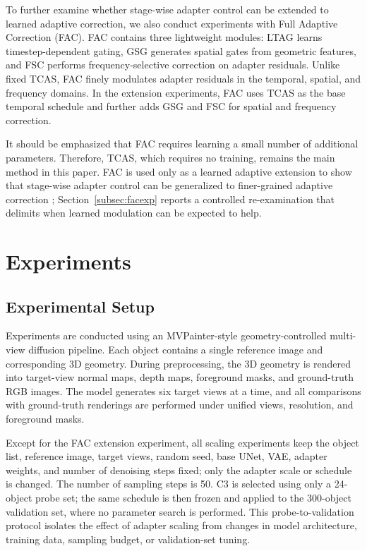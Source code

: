 \documentclass[times,twocolumn,final]{elsarticle}
\providecommand{\DIFadd}[1]{{\protect\color{red} \sf #1}} %
\providecommand{\DIFdel}[1]{{\protect\color{red} \scriptsize #1}} %
\providecommand{\DIFaddbegin}{} %
\providecommand{\DIFaddend}{} %
\providecommand{\DIFdelbegin}{} %
\providecommand{\DIFdelend}{} %
\newcommand{\DIFscaledelfig}{0.5}
\newlength{\DIFdelgraphicswidth} %
\newlength{\DIFdelgraphicsheight} %
\newcommand{\DIFaddincludegraphics}[2][]{{\color{red}\fbox{\DIFOincludegraphics[#1]{#2}}}} %
\newcommand{\DIFdelincludegraphics}[2][]{%
\sbox{\DIFdelgraphicsbox}{\DIFOincludegraphics[#1]{#2}}%
\settoboxwidth{\DIFdelgraphicswidth}{\DIFdelgraphicsbox} %
\settoboxtotalheight{\DIFdelgraphicsheight}{\DIFdelgraphicsbox} %
\scalebox{\DIFscaledelfig}{%
\parbox[b]{\DIFdelgraphicswidth}{\usebox{\DIFdelgraphicsbox}\\[-\baselineskip] \rule{\DIFdelgraphicswidth}{0em}}\llap{\resizebox{\DIFdelgraphicswidth}{\DIFdelgraphicsheight}{%
\setlength{\unitlength}{\DIFdelgraphicswidth}%
\begin{picture}(1,1)%
\thicklines\linethickness{2pt} %
{\color[rgb]{1,0,0}\put(0,0){\framebox(1,1){}}}%
{\color[rgb]{1,0,0}\put(0,0){\line( 1,1){1}}}%
{\color[rgb]{1,0,0}\put(0,1){\line(1,-1){1}}}%
\end{picture}%
}\hspace*{3pt}}} %
} %
\DeclareRobustCommand{\DIFaddbegin}{\DIFOaddbegin \let\includegraphics\DIFaddincludegraphics} %
\DeclareRobustCommand{\DIFaddend}{\DIFOaddend \let\includegraphics\DIFOincludegraphics} %
\DeclareRobustCommand{\DIFdelbegin}{\DIFOdelbegin \let\includegraphics\DIFdelincludegraphics} %
\DeclareRobustCommand{\DIFdelend}{\DIFOaddend \let\includegraphics\DIFOincludegraphics} %
\begin{document}
To further examine whether stage-wise adapter control can be extended to learned adaptive correction, we also conduct experiments with Full Adaptive Correction (FAC). FAC contains three lightweight modules: LTAG learns timestep-dependent gating, GSG generates spatial gates from geometric features, and FSC performs frequency-selective correction on adapter residuals. Unlike fixed TCAS, FAC finely modulates adapter residuals in the temporal, spatial, and frequency domains. In the extension experiments, FAC uses TCAS as the base temporal schedule and further adds GSG and FSC for spatial and frequency correction.

It should be emphasized that FAC requires learning a small number of additional parameters. Therefore, TCAS, which requires no training, remains the main method in this paper. FAC is used only as a learned adaptive extension\DIFdelbegin \DIFdel{to show that stage-wise adapter control can be generalized to finer-grained adaptive correction}\DIFdelend \DIFaddbegin \DIFadd{; Section~\ref{subsec:facexp} reports a controlled re-examination that delimits when learned modulation can be expected to help}\DIFaddend .

\section{Experiments}
\label{sec:experiments}

\subsection{Experimental Setup}
\label{subsec:setup}

Experiments are conducted using an MVPainter-style geometry-controlled multi-view diffusion pipeline. Each object contains a single reference image and corresponding 3D geometry. During preprocessing, the 3D geometry is rendered into target-view normal maps, depth maps, foreground masks, and ground-truth RGB images. The model generates six target views at a time, and all comparisons with ground-truth renderings are performed under unified views, resolution, and foreground masks.

Except for the FAC extension experiment, all scaling experiments keep the object list, reference image, target views, random seed, base UNet, VAE, adapter weights, and number of denoising steps fixed; only the adapter scale or schedule is changed. The number of sampling steps is 50. C3 is selected using only a 24-object probe set; the same schedule is then frozen and applied to the 300-object validation set, where no parameter search is performed. This probe-to-validation protocol isolates the effect of adapter scaling from changes in model architecture, training data, sampling budget, or validation-set tuning.
\end{document}
